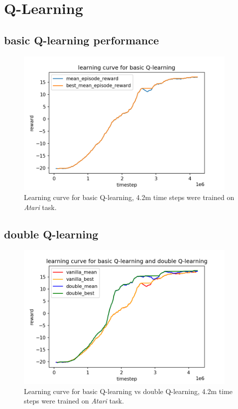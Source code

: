 \documentclass[12pt]{article}
\begin{document}
\pagebreak

\section{Q-Learning}
\subsection{basic Q-learning performance}
\begin{figure}[!h]
\centering
\includegraphics[width=4.2in]{Figure_1.png}
\caption{Learning curve for basic Q-learning, 4.2m time steps were trained on \textit{Atari} task.}
\end{figure}

\subsection{double Q-learning}
\begin{figure}[!h]
\centering
\includegraphics[width=4.2in]{Figure_2.png}
\caption{Learning curve for basic Q-learning vs double Q-learning, 4.2m time steps were trained on \textit{Atari} task.}
\end{figure}
\end{document}
